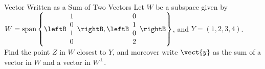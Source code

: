 \begin{example}{Vector Written as a Sum of Two Vectors}\label{exa:sumoftwovectors}
Let $W$ be a subspace given by $W = \mbox{span} \left\{
\leftB
\begin{array}{c}
1 \\
0 \\
1 \\
0 \\
\end{array}
\rightB, 
\leftB 
\begin{array}{c}
0 \\
1 \\
0 \\
2 \\
\end{array}
\rightB
\right\}$, and $Y = (1,2,3,4)$. \\
Find the point $Z$ in $W$ closest to $Y$, and moreover write $\vect{y}$ as the sum of a  vector in $W$ and a vector in $W^{\perp}$. 
\end{example}

